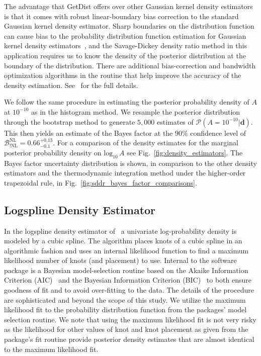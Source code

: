 The advantage that GetDist offers over other Gaussian kernel density estimators is that it comes with robust linear-boundary bias correction to the standard Gaussian kernel density estimator. Sharp boundaries on the distribution function can cause bias to the probability distribution function estimation for Gaussian kernel density estimators~\citep{lewis2015getdist}, and the Savage-Dickey density ratio method in this application requires us to know the density of the posterior distribution at the boundary of the distribution. There are additional bias-correction and bandwidth optimization algorithms in the routine that help improve the accuracy of the density estimation. See~\cite{lewis2015getdist} for the full details.

We follow the same procedure in estimating the posterior probability density of $A$ at $10^{-10}$ as in the histogram method. We resample the posterior distribution through the bootstrap method to generate $5,000$ estimates of $\mathcal{P}(A =10^{-10}|\mathbf{d})$. This then yields an estimate of the Bayes factor at the $90\%$ confidence level of $\mathcal{B}^{\mathrm{NL}}_{!\mathrm{NL}} = 0.66^{+0.13}_{-0.1}$. For a comparison of the density estimates for the marginal posterior probability density on $\mathrm{log}_{10} \, A$ see Fig.~\ref{fig:density_estimators}. The Bayes factor uncertainty distribution is shown, in comparison to the other density estimators and the thermodynamic integration method under the higher-order trapezoidal rule, in Fig.~\ref{fig:sddr_bayes_factor_comparisons}.

\subsection{Logspline Density Estimator}
In the logspline density estimator of~\cite{stone1997polynomial} a univariate log-probability density is modeled by a cubic spline. The algorithm places knots of a cubic spline in an algorithmic fashion and uses an internal likelihood function to find a maximum likelihood number of knots (and placement) to use. Internal to the software package is a Bayesian model-selection routine based on the Akaike Information Criterion (AIC)~\citep{akaike1981likelihood} and the Bayesian Information Criterion (BIC)~\citep{schwarz1978estimating} to both ensure goodness of fit and to avoid over-fitting to the data. The details of the procedure are sophisticated and beyond the scope of this study. We utilize the maximum likelihood fit to the probability distribution function from the packages' model selection routine. We note that using the maximum likelihood fit is not very risky as the likelihood for other values of knot and knot placement as given from the package's fit routine provide posterior density estimates that are almost identical to the maximum likelihood fit.

